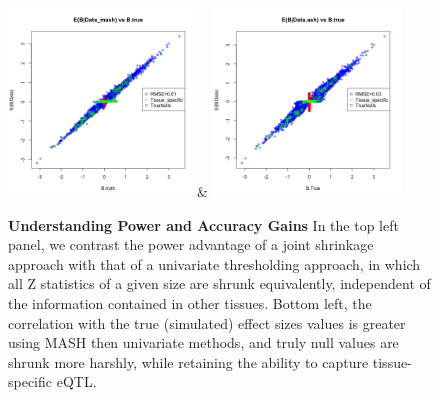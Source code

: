 \begin{figure}[htbp]
\includegraphics[width=5cm]{Figures/scatterplot_truthbspec.png}&
\includegraphics[width=5cm]{Figures/scatterplot_TRUTHashbspec.png}
\caption{\textbf{Understanding Power and Accuracy Gains} In the top left panel, we contrast the power advantage of a joint shrinkage approach with that of a univariate thresholding approach, in which all Z statistics of a given size are shrunk equivalently, independent of the information contained in other tissues. Bottom left, the correlation with the true (simulated) effect sizes values is greater using MASH then univariate methods, and truly null values are shrunk more harshly, while retaining the ability to capture tissue-specific eQTL.}
 \label{fig:simulationscatter}
\end{figure}\newline

